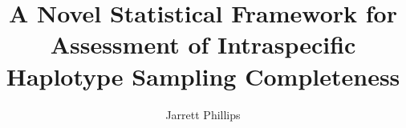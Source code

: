  
\title{A Novel Statistical Framework for Assessment of Intraspecific Haplotype Sampling Completeness}
\author{Jarrett Phillips}
%
%
%
\maketitle
